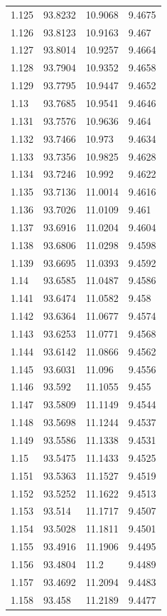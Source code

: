 \begin{tabular}{llll}
1.125 & 93.8232 & 10.9068 & 9.4675 \\
1.126 & 93.8123 & 10.9163 & 9.467 \\
1.127 & 93.8014 & 10.9257 & 9.4664 \\
1.128 & 93.7904 & 10.9352 & 9.4658 \\
1.129 & 93.7795 & 10.9447 & 9.4652 \\
1.13 & 93.7685 & 10.9541 & 9.4646 \\
1.131 & 93.7576 & 10.9636 & 9.464 \\
1.132 & 93.7466 & 10.973 & 9.4634 \\
1.133 & 93.7356 & 10.9825 & 9.4628 \\
1.134 & 93.7246 & 10.992 & 9.4622 \\
1.135 & 93.7136 & 11.0014 & 9.4616 \\
1.136 & 93.7026 & 11.0109 & 9.461 \\
1.137 & 93.6916 & 11.0204 & 9.4604 \\
1.138 & 93.6806 & 11.0298 & 9.4598 \\
1.139 & 93.6695 & 11.0393 & 9.4592 \\
1.14 & 93.6585 & 11.0487 & 9.4586 \\
1.141 & 93.6474 & 11.0582 & 9.458 \\
1.142 & 93.6364 & 11.0677 & 9.4574 \\
1.143 & 93.6253 & 11.0771 & 9.4568 \\
1.144 & 93.6142 & 11.0866 & 9.4562 \\
1.145 & 93.6031 & 11.096 & 9.4556 \\
1.146 & 93.592 & 11.1055 & 9.455 \\
1.147 & 93.5809 & 11.1149 & 9.4544 \\
1.148 & 93.5698 & 11.1244 & 9.4537 \\
1.149 & 93.5586 & 11.1338 & 9.4531 \\
1.15 & 93.5475 & 11.1433 & 9.4525 \\
1.151 & 93.5363 & 11.1527 & 9.4519 \\
1.152 & 93.5252 & 11.1622 & 9.4513 \\
1.153 & 93.514 & 11.1717 & 9.4507 \\
1.154 & 93.5028 & 11.1811 & 9.4501 \\
1.155 & 93.4916 & 11.1906 & 9.4495 \\
1.156 & 93.4804 & 11.2 & 9.4489 \\
1.157 & 93.4692 & 11.2094 & 9.4483 \\
1.158 & 93.458 & 11.2189 & 9.4477 \\

\end{tabular}
